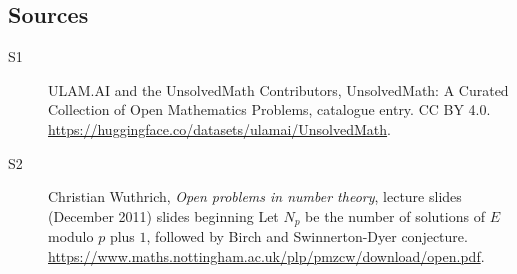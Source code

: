 \documentclass[11pt]{article}
\begin{document}
\subsection{Sources}
\begin{description}
\item[\hypertarget{source:statement:1}{S1}] ULAM.AI and the UnsolvedMath Contributors, UnsolvedMath: A Curated Collection of Open Mathematics Problems, catalogue entry. CC BY 4.0. \url{https://huggingface.co/datasets/ulamai/UnsolvedMath}.
\item[\hypertarget{source:statement:2}{S2}] Christian Wuthrich, \emph{Open problems in number theory}, lecture slides (December 2011) slides beginning Let $N_p$ be the number of solutions of $E$ modulo $p$ plus $1$, followed by Birch and Swinnerton-Dyer conjecture. \url{https://www.maths.nottingham.ac.uk/plp/pmzcw/download/open.pdf}.
\end{description}
\label{end:statement}
\end{document}
